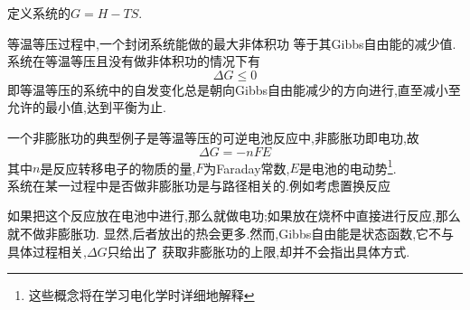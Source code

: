 \documentclass{ctexart}
\begin{document}
\begin{definition}[3E.2.1 Gibbs自由能]
    定义系统的$G=H-TS$.
\end{definition}
\begin{theorem}[3E.2.2 Gibbs自由能用于自发过程的判据]
    等温等压过程中,一个封闭系统能做的最大非体积功%
    等于其Gibbs自由能的减少值.\\
    系统在等温等压且没有做非体积功的情况下有
    \[\Delta G\leqslant0\]
    即等温等压的系统中的自发变化总是朝向Gibbs自由能减少的方向进行,直至减小至%
    允许的最小值,达到平衡为止.
\end{theorem}
一个非膨胀功的典型例子是等温等压的可逆电池反应中,非膨胀功即电功,故
\[\Delta G=-nFE\]
其中$n$是反应转移电子的物质的量,$F$为Faraday常数,$E$是电池的电动势\footnote{这些概念将在学习电化学时详细地解释}.\\
\indent 系统在某一过程中是否做非膨胀功是与路径相关的.例如考虑置换反应
\begin{tightcenter}
\end{tightcenter}
如果把这个反应放在电池中进行,那么就做电功;如果放在烧杯中直接进行反应,那么就不做非膨胀功.%
显然,后者放出的热会更多.然而,Gibbs自由能是状态函数,它不与具体过程相关,$\Delta G$只给出了%
获取非膨胀功的上限,却并不会指出具体方式.
\end{document}
